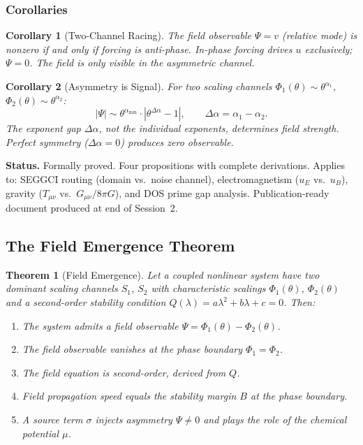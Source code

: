 \documentclass[11pt,twoside]{article}
\newtheorem{theorem}{Theorem}[section]
\newtheorem{corollary}{Corollary}[section]
\begin{document}
\subsubsection{Corollaries}

\begin{corollary}[Two-Channel Racing]
The field observable $\Psi = v$ (relative mode) is nonzero if and only if forcing is
anti-phase. In-phase forcing drives $u$ exclusively; $\Psi = 0$. The field is only
visible in the asymmetric channel.
\end{corollary}

\begin{corollary}[Asymmetry is Signal]
For two scaling channels $\Phi_1(\theta) \sim \theta^{\alpha_1}$,
$\Phi_2(\theta) \sim \theta^{\alpha_2}$:
\[
  |\Psi| \sim \theta^{\alpha_{\min}} \cdot |\theta^{\Delta\alpha} - 1|,
  \qquad \Delta\alpha = \alpha_1 - \alpha_2.
\]
The exponent \emph{gap} $\Delta\alpha$, not the individual exponents, determines field
strength. Perfect symmetry ($\Delta\alpha = 0$) produces zero observable.
\end{corollary}

\begin{confirmedenv}
\textbf{Status.} Formally proved. Four propositions with complete derivations.
Applies to: SEGGCI routing (domain vs.\ noise channel), electromagnetism ($u_E$ vs.\
$u_B$), gravity ($T_{\mu\nu}$ vs.\ $G_{\mu\nu}/8\pi G$), and DOS prime gap analysis.
Publication-ready document produced at end of Session~2.
\end{confirmedenv}

\subsection{The Field Emergence Theorem}

\begin{theorem}[Field Emergence]
Let a coupled nonlinear system have two dominant scaling channels $S_1$, $S_2$
with characteristic scalings $\Phi_1(\theta)$, $\Phi_2(\theta)$ and a second-order
stability condition $Q(\lambda) = a\lambda^2 + b\lambda + c = 0$. Then:
\begin{enumerate}
  \item The system admits a field observable $\Psi = \Phi_1(\theta) - \Phi_2(\theta)$.
  \item The field observable vanishes at the phase boundary $\Phi_1 = \Phi_2$.
  \item The field equation is second-order, derived from $Q$.
  \item Field propagation speed equals the stability margin $B$ at the phase boundary.
  \item A source term $\sigma$ injects asymmetry $\Psi \neq 0$ and plays the role of
        the chemical potential $\mu$.
\end{enumerate}
\end{theorem}
\end{document}
